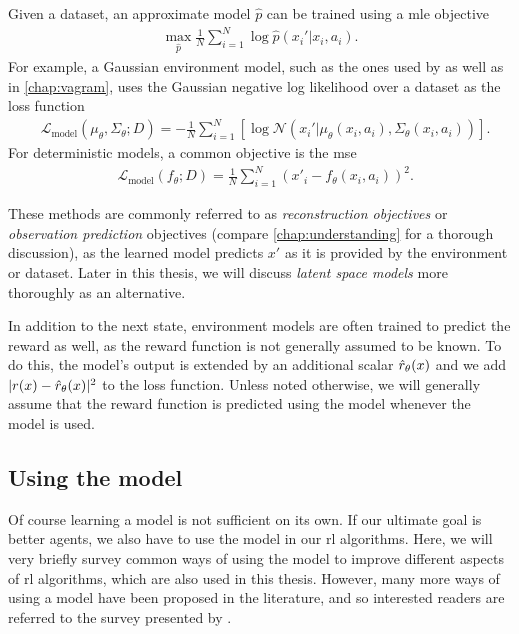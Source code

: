 Given a dataset, an approximate model $\hat{p}$ can be trained using a \ac{mle} objective 
\begin{align}
\max_{\hat{p}} \frac{1}{N}\sum_{i=1}^N \log \hat{p}(x_i'|x_i,a_i).
\end{align}
For example, a Gaussian environment model, such as the ones used by \textcite{pets,janner2019mbpo} as well as in \autoref{chap:vagram}, uses the Gaussian negative log likelihood over a dataset as the loss function
\begin{align}
    &\mathcal{L}_\mathrm{model}(\mu_\theta, \Sigma_\theta; D) = - \frac{1}{N} \sum_{i=1}^N \left[\log \mathcal{N}(x_i' | \mu_\theta(x_i,a_i), \Sigma_\theta(x_i, a_i)) \right].
\end{align}
For deterministic models, a common objective is the \ac{mse}
\begin{align}
    &\mathcal{L}_\mathrm{model}(f_\theta; D) = \frac{1}{N} \sum_{i=1}^N (x'_i - f_\theta(x_i, a_i))^2.
\end{align}

These methods are commonly referred to as \emph{reconstruction objectives} or \emph{observation prediction} objectives (compare \autoref{chap:understanding} for a thorough discussion), as the learned model predicts $x'$ as it is provided by the environment or dataset.
Later in this thesis, we will discuss \emph{latent space models} more thoroughly as an alternative.

In addition to the next state, environment models are often trained to predict the reward as well, as the reward function is not generally assumed to be known.
To do this, the model's output is extended by an additional scalar $\hat{r}_\theta(x)$ and we add $|r(x) - \hat{r}_\theta(x)|^2$ to the loss function.
Unless noted otherwise, we will generally assume that the reward function is predicted using the model whenever the model is used.

\subsection{Using the model}

Of course learning a model is not sufficient on its own.
If our ultimate goal is better agents, we also have to use the model in our \ac{rl} algorithms.
Here, we will very briefly survey common ways of using the model to improve different aspects of \ac{rl} algorithms, which are also used in this thesis.
However, many more ways of using a model have been proposed in the literature, and so interested readers are referred to the survey presented by \textcite{moerland}. 

